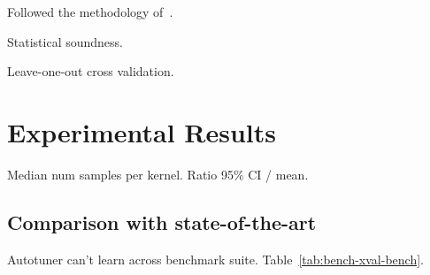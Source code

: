 \documentclass[preprint,nonatbib,10pt,nocopyrightspace]{sigplanconf}
\begin{document}
Followed the methodology of~\cite{Grewe2013}.

Statistical soundness.

Leave-one-out cross validation.


\section{Experimental Results}\label{sec:evaluation}

Median num samples per kernel. Ratio 95\% CI / mean.

\subsection{Comparison with state-of-the-art}

Autotuner can't learn across benchmark
suite. Table~\ref{tab:bench-xval-bench}.

\begin{table}%
  \centering
  \\
  \caption{%
    Cross-benchmark autotuning results.}
\label{tab:bench-xval-bench}
\end{table}
\end{document}
